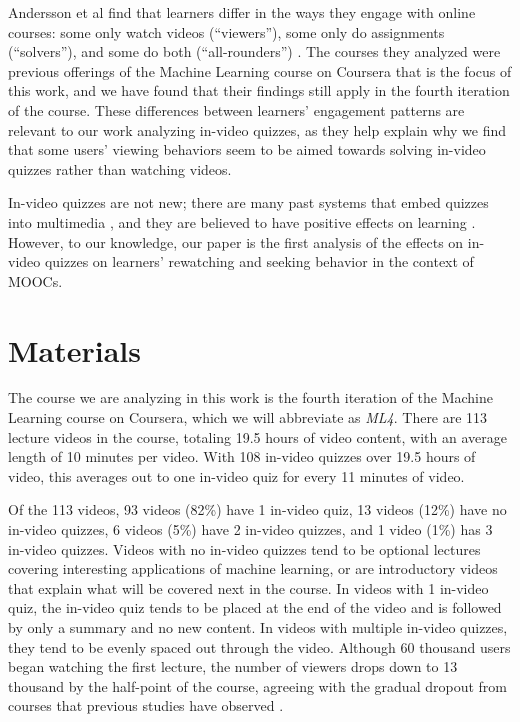 \documentclass[letterpaper]{article}
\begin{document}
Andersson et al find that learners differ in the ways they engage with online courses: some only watch videos (``viewers''), some only do assignments (``solvers''), and some do both (``all-rounders'') \cite{ashton}. The courses they analyzed were previous offerings of the Machine Learning course on Coursera that is the focus of this work, and we have found that their findings still apply in the fourth iteration of the course. These differences between learners' engagement patterns are relevant to our work analyzing in-video quizzes, as they help explain why we find that some users' viewing behaviors seem to be aimed towards solving in-video quizzes rather than watching videos.

In-video quizzes are not new; there are many past systems that embed quizzes into multimedia \cite{multimedia}, and they are believed to have positive effects on learning \cite{embedded}. However, to our knowledge, our paper is the first analysis of the effects on in-video quizzes on learners' rewatching and seeking behavior in the context of MOOCs.

\newpage

\section{Materials}

The course we are analyzing in this work is the fourth iteration of the Machine Learning course on Coursera, which we will abbreviate as \textit{ML4}. There are 113 lecture videos in the course, totaling 19.5 hours of video content, with an average length of 10 minutes per video.  With 108 in-video quizzes over 19.5 hours of video, this averages out to one in-video quiz for every 11 minutes of video.

Of the 113 videos, 93 videos (82\%) have 1 in-video quiz, 13 videos (12\%) have no in-video quizzes, 6 videos (5\%) have 2 in-video quizzes, and 1 video (1\%) has 3 in-video quizzes. Videos with no in-video quizzes tend to be optional lectures covering interesting applications of machine learning, or are introductory videos that explain what will be covered next in the course. In videos with 1 in-video quiz, the in-video quiz tends to be placed at the end of the video and is followed by only a summary and no new content. In videos with multiple in-video quizzes, they tend to be evenly spaced out through the video. Although 60 thousand users began watching the first lecture, the number of viewers drops down to 13 thousand by the half-point of the course, agreeing with the gradual dropout from courses that previous studies have observed \cite{dropout}.
\end{document}
